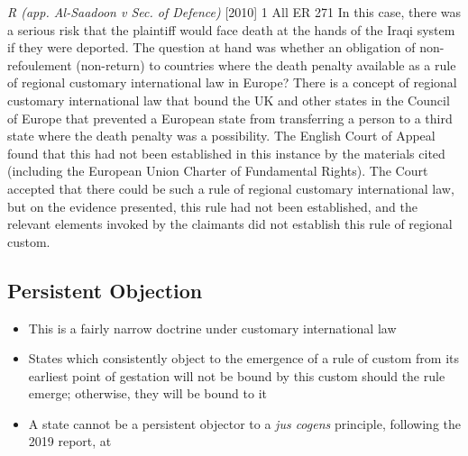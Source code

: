\begin{casedetails}{\textit{R (app. Al-Saadoon v Sec. of Defence)} [2010] 1 All ER 271}\label{case:R (Al-Saadoon v Sec. of Defence)}
    \flushleft
    In this case, there was a serious risk that the plaintiff would face death at the hands of the Iraqi system if they were deported. The question at hand was whether an obligation of non-refoulement (non-return) to countries where the death penalty available as a rule of regional customary international law in Europe? There is a concept of regional customary international law that bound the UK and other states in the Council of Europe that prevented a European state from transferring a person to a third state where the death penalty was a possibility. The English Court of Appeal found that this had not been established in this instance by the materials cited (including the European Union Charter of Fundamental Rights). The Court accepted that there could be such a rule of regional customary international law, but on the evidence presented, this rule had not been established, and the relevant elements invoked by the claimants did not establish this rule of regional custom.

\end{casedetails}

\subsection{Persistent Objection}
\begin{itemize}
    \item This is a fairly narrow doctrine under customary international law
    \item States which consistently object to the emergence of a rule of custom from its earliest point of gestation will not be bound by this custom should the rule emerge; otherwise, they will be bound to it
    \item A state cannot be a persistent objector to a \textit{jus cogens} principle, following the  2019 report, at 
\end{itemize}

